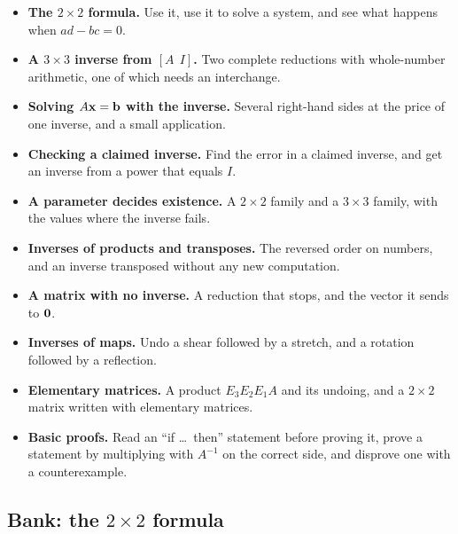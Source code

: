 \documentclass[11pt]{article}
\begin{document}
\begin{remark}
\begin{itemize}
  \item \textbf{The $2\times2$ formula.} Use it, use it to solve a system, and see what happens when $ad-bc=0$.
  \item \textbf{A $3\times3$ inverse from $[A\ \ I]$.} Two complete reductions with whole-number arithmetic, one of which needs an interchange.
  \item \textbf{Solving $A\mathbf{x}=\mathbf{b}$ with the inverse.} Several right-hand sides at the price of one inverse, and a small application.
  \item \textbf{Checking a claimed inverse.} Find the error in a claimed inverse, and get an inverse from a power that equals $I$.
  \item \textbf{A parameter decides existence.} A $2\times2$ family and a $3\times3$ family, with the values where the inverse fails.
  \item \textbf{Inverses of products and transposes.} The reversed order on numbers, and an inverse transposed without any new computation.
  \item \textbf{A matrix with no inverse.} A reduction that stops, and the vector it sends to $\mathbf{0}$.
  \item \textbf{Inverses of maps.} Undo a shear followed by a stretch, and a rotation followed by a reflection.
  \item \textbf{Elementary matrices.} A product $E_3E_2E_1A$ and its undoing, and a $2\times2$ matrix written with elementary matrices.
  \item \textbf{Basic proofs.} Read an ``if \dots\ then'' statement before proving it, prove a statement by multiplying with $A^{-1}$ on the correct side, and disprove one with a counterexample.
\end{itemize}
\end{remark}

\subsection*{Bank: the $2\times2$ formula}
\end{document}
